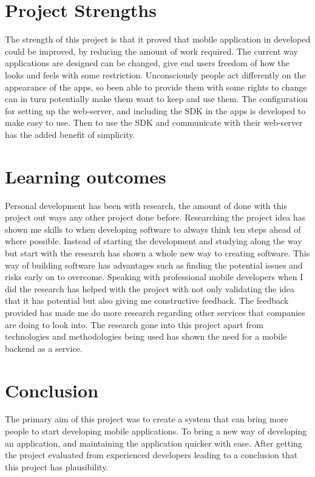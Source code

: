 \section{Project Strengths}

The strength of this project is that it proved that mobile application in developed could be improved, by reducing the amount of work required. The current way applications are designed can be changed, give end users freedom of how the looks and feels with some restriction. Unconsciously people act differently on the appearance of the apps, so been able to provide them with some rights to change can in turn potentially make them want to keep and use them. The configuration for setting up the web-server, and including the SDK in the apps is developed to make easy to use. Then to use the SDK and communicate with their web-server has the added benefit of simplicity.

\section{Learning outcomes}


Personal development has been with research, the amount of done with this project out ways any other project done before. Researching the project idea has shown me skills to when developing software to always think ten steps ahead of where possible. Instead of starting the development and studying along the way but start with the research has shown a whole new way to creating software. This way of building software has advantages such as finding the potential issues and risks early on to overcome. Speaking with professional mobile developers when I did the research has helped with the project with not only validating the idea that it has potential but also giving me constructive feedback. The feedback provided has made me do more research regarding other services that companies are doing to look into. The research gone into this project apart from technologies and methodologies being used has shown the need for a mobile backend as a service.


\section{Conclusion}
The primary aim of this project was to create a system that can bring more people to start developing mobile applications. To bring a new way of developing an application, and maintaining the application quicker with ease. After getting the project evaluated from experienced developers leading to a conclusion that this project has plausibility.
